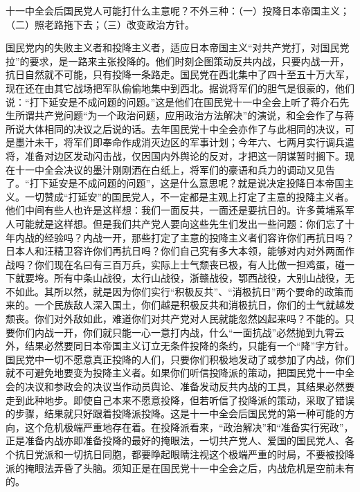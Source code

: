 十一中全会后国民党人可能打什么主意呢？不外三种：（一）投降日本帝国主义；（二）照老路拖下去；（三）改变政治方针。

国民党内的失败主义者和投降主义者，适应日本帝国主义“对共产党打，对国民党拉”的要求，是一路来主张投降的。他们时刻企图策动反共内战，只要内战一开，抗日自然就不可能，只有投降一条路走。国民党在西北集中了四十至五十万大军，现在还在由其它战场把军队偷偷地集中到西北。据说将军们的胆气是很豪的，他们说：“打下延安是不成问题的问题。”这是他们在国民党十一中全会上听了蒋介石先生所谓共产党问题“为一个政治问题，应用政治方法解决”的演说，和全会作了与蒋所说大体相同的决议之后说的话。去年国民党十中全会亦作了与此相同的决议，可是墨汁未干，将军们即奉命作成消灭边区的军事计划；今年六、七两月实行调兵遣将，准备对边区发动闪击战，仅因国内外舆论的反对，才把这一阴谋暂时搁下。现在十一中全会决议的墨汁刚刚洒在白纸上，将军们的豪语和兵力的调动又见告了。“打下延安是不成问题的问题”，这是什么意思呢？就是说决定投降日本帝国主义。一切赞成“打延安”的国民党人，不一定都是主观上打定了主意的投降主义者。他们中间有些人也许是这样想：我们一面反共，一面还是要抗日的。许多黄埔系军人可能就是这样想。但是我们共产党人要向这些先生们发出一些问题：你们忘了十年内战的经验吗？内战一开，那些打定了主意的投降主义者们容许你们再抗日吗？日本人和汪精卫容许你们再抗日吗？你们自己究有多大本领，能够对内对外两面作战吗？你们现在名曰有三百万兵，实际上士气颓丧已极，有人比做一担鸡蛋，碰一下就要垮。所有中条山战役，太行山战役，浙赣战役，鄂西战役，大别山战役，无不如此。其所以然，就是因为你们实行“积极反共”、“消极抗日”两个要命的政策而来的。一个民族敌人深入国土，你们越是积极反共和消极抗日，你们的士气就越发颓丧。你们对外敌如此，难道你们对共产党对人民就能忽然凶起来吗？不能的。只要你们内战一开，你们就只能一心一意打内战，什么“一面抗战”必然抛到九霄云外，结果必然要同日本帝国主义订立无条件投降的条约，只能有一个“降”字方针。国民党中一切不愿意真正投降的人们，只要你们积极地发动了或参加了内战，你们就不可避免地要变为投降主义者。如果你们听信投降派的策动，把国民党十一中全会的决议和参政会的决议当作动员舆论、准备发动反共内战的工具，其结果必然要走到此种地步。即使自己本来不愿意投降，但若听信了投降派的策动，采取了错误的步骤，结果就只好跟着投降派投降。这是十一中全会后国民党的第一种可能的方向，这个危机极端严重地存在着。在投降派看来，“政治解决”和“准备实行宪政”，正是准备内战亦即准备投降的最好的掩眼法，一切共产党人、爱国的国民党人、各个抗日党派和一切抗日同胞，都要睁起眼睛注视这个极端严重的时局，不要被投降派的掩眼法弄昏了头脑。须知正是在国民党十一中全会之后，内战危机是空前未有的。

